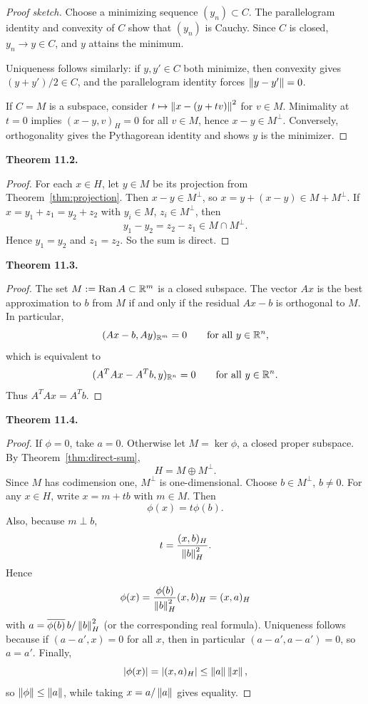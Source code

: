 \documentclass[11pt]{article}
\newenvironment{theoremstmt}[1]{%
  \par\medskip\noindent\textbf{Theorem #1. }\itshape
}{\par\medskip}
\begin{document}
\begin{proof}[Proof sketch]
Choose a minimizing sequence $(y_n)\subset C$. The parallelogram identity and convexity of $C$ show that $(y_n)$ is Cauchy. Since $C$ is closed, $y_n\to y\in C$, and $y$ attains the minimum.

Uniqueness follows similarly: if $y,y'\in C$ both minimize, then convexity gives $(y+y')/2\in C$, and the parallelogram identity forces $\left\lVert y-y'\right\rVert=0$.

If $C=M$ is a subspace, consider $t\mapsto \left\lVert x-(y+tv)\right\rVert^2$ for $v\in M$. Minimality at $t=0$ implies $(x-y,v)_H=0$ for all $v\in M$, hence $x-y\in M^{\perp}$. Conversely, orthogonality gives the Pythagorean identity and shows $y$ is the minimizer.
\end{proof}

\begin{theoremstmt}{11.2}
\thmDirectSum
\end{theoremstmt}

\begin{proof}
For each $x\in H$, let $y\in M$ be its projection from Theorem~\ref{thm:projection}. Then $x-y\in M^{\perp}$, so $x=y+(x-y)\in M+M^{\perp}$. If $x=y_1+z_1=y_2+z_2$ with $y_i\in M$, $z_i\in M^{\perp}$, then
\[
y_1-y_2=z_2-z_1\in M\cap M^{\perp}.
\]
Hence $y_1=y_2$ and $z_1=z_2$. So the sum is direct.
\end{proof}

\begin{theoremstmt}{11.3}
\thmLeastSquares
\end{theoremstmt}

\begin{proof}
The set $M:=\operatorname{Ran}A\subset\mathbb{R}^m$ is a closed subspace. The vector $Ax$ is the best approximation to $b$ from $M$ if and only if the residual $Ax-b$ is orthogonal to $M$. In particular,
\[
(Ax-b,Ay)_{\mathbb{R}^m}=0\qquad\text{for all }y\in\mathbb{R}^n,
\]
which is equivalent to
\[
(A^TAx-A^Tb,y)_{\mathbb{R}^n}=0\qquad\text{for all }y\in\mathbb{R}^n.
\]
Thus $A^TAx=A^Tb$.
\end{proof}

\begin{theoremstmt}{11.4}
\thmRieszRepresentation
\end{theoremstmt}

\begin{proof}
If $\phi=0$, take $a=0$. Otherwise let $M=\ker\phi$, a closed proper subspace. By Theorem~\ref{thm:direct-sum},
\[
H=M\oplus M^{\perp}.
\]
Since $M$ has codimension one, $M^{\perp}$ is one-dimensional. Choose $b\in M^{\perp}$, $b\neq 0$. For any $x\in H$, write $x=m+tb$ with $m\in M$. Then
\[
\phi(x)=t\phi(b).
\]
Also, because $m\perp b$,
\[
t=\frac{(x,b)_H}{\left\lVert b\right\rVert_H^2}.
\]
Hence
\[
\phi(x)=\frac{\phi(b)}{\left\lVert b\right\rVert_H^2}(x,b)_H=(x,a)_H
\]
with $a=\overline{\phi(b)}\,b/\left\lVert b\right\rVert_H^2$ (or the corresponding real formula). Uniqueness follows because if $(a-a',x)=0$ for all $x$, then in particular $(a-a',a-a')=0$, so $a=a'$. Finally,
\[
\left\lvert \phi(x)\right\rvert=\left\lvert (x,a)_H\right\rvert\le \left\lVert a\right\rVert\left\lVert x\right\rVert,
\]
so $\left\lVert \phi\right\rVert\le \left\lVert a\right\rVert$, while taking $x=a/\left\lVert a\right\rVert$ gives equality.
\end{proof}
\end{document}
